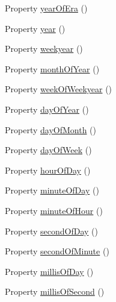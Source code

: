 \begin{DoxyCompactItemize}
Property \hyperlink{classorg_1_1joda_1_1time_1_1_date_time_ae59326c4fb0d072aee2a526ad4a24fa4}{year\-Of\-Era} ()
\item 
Property \hyperlink{classorg_1_1joda_1_1time_1_1_date_time_a2fad630c40bee720a815fb4e2a06f133}{year} ()
\item 
Property \hyperlink{classorg_1_1joda_1_1time_1_1_date_time_a19b1e0d0453e781d78fb39af6aa08459}{weekyear} ()
\item 
Property \hyperlink{classorg_1_1joda_1_1time_1_1_date_time_a9119fa14bbe721475778ba261337aa0e}{month\-Of\-Year} ()
\item 
Property \hyperlink{classorg_1_1joda_1_1time_1_1_date_time_a0f0b001e7b35230352dee10dd1d492fb}{week\-Of\-Weekyear} ()
\item 
Property \hyperlink{classorg_1_1joda_1_1time_1_1_date_time_a2c4dc0f893bacc99b4bd120ada03a13f}{day\-Of\-Year} ()
\item 
Property \hyperlink{classorg_1_1joda_1_1time_1_1_date_time_ae2edf04c8cc742fdfcd838acf53f8751}{day\-Of\-Month} ()
\item 
Property \hyperlink{classorg_1_1joda_1_1time_1_1_date_time_aa1e61ab5bdfee2ac94d3d7962e359ab3}{day\-Of\-Week} ()
\item 
Property \hyperlink{classorg_1_1joda_1_1time_1_1_date_time_ad4d63b2e220315cf5eb57d3960f65ba5}{hour\-Of\-Day} ()
\item 
Property \hyperlink{classorg_1_1joda_1_1time_1_1_date_time_ad70b21f232fee2eb7bd386de6818244e}{minute\-Of\-Day} ()
\item 
Property \hyperlink{classorg_1_1joda_1_1time_1_1_date_time_ab9fa72f78065c0a7abb9819505d66ee6}{minute\-Of\-Hour} ()
\item 
Property \hyperlink{classorg_1_1joda_1_1time_1_1_date_time_a66d0039299d7e64db042a04ca5f90fd4}{second\-Of\-Day} ()
\item 
Property \hyperlink{classorg_1_1joda_1_1time_1_1_date_time_a9dee7bbe22d6f87a9dedc9017be29550}{second\-Of\-Minute} ()
\item 
Property \hyperlink{classorg_1_1joda_1_1time_1_1_date_time_aa2ffb7b4dbf5ccda099e408bb59159bb}{millis\-Of\-Day} ()
\item 
Property \hyperlink{classorg_1_1joda_1_1time_1_1_date_time_adebe1a924958e8d4e127d5b278887eee}{millis\-Of\-Second} ()
\end{DoxyCompactItemize}
